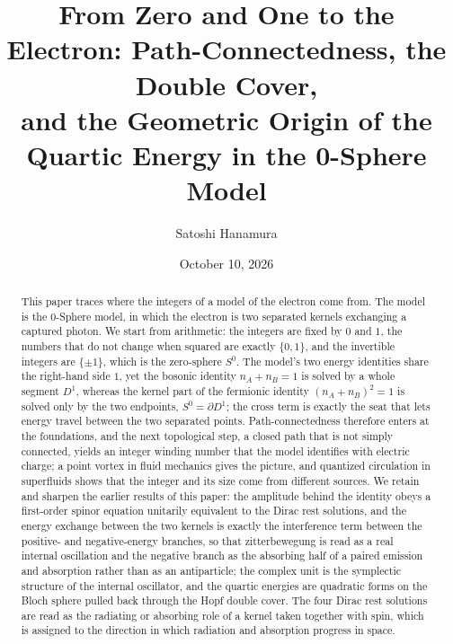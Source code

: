 \documentclass[%
 reprint, amsmath,amssymb, aps, prb, ]{revtex4-2}
\numberwithin{equation}{section}
\begin{document}
\title{From Zero and One to the Electron: Path-Connectedness, the Double Cover,\\ and the Geometric Origin of the Quartic Energy in the 0-Sphere Model}

\author{Satoshi Hanamura}

\date{October 10, 2026}

\begin{abstract}
This paper traces where the integers of a model of the electron come from. The model is the 0-Sphere model, in which the electron is two separated kernels exchanging a captured photon.
We start from arithmetic: the integers are fixed by $0$ and $1$, the numbers that do not change when squared are exactly $\{0,1\}$, and the invertible integers are $\{\pm1\}$, which is the zero-sphere $S^0$.
The model's two energy identities share the right-hand side $1$, yet the bosonic identity $n_A+n_B=1$ is solved by a whole segment $D^1$, whereas the kernel part of the fermionic identity $(n_A+n_B)^2=1$ is solved only by the two endpoints, $S^0=\partial D^1$; the cross term is exactly the seat that lets energy travel between the two separated points.
Path-connectedness therefore enters at the foundations, and the next topological step, a closed path that is not simply connected, yields an integer winding number that the model identifies with electric charge; a point vortex in fluid mechanics gives the picture, and quantized circulation in superfluids shows that the integer and its size come from different sources.
We retain and sharpen the earlier results of this paper: the amplitude behind the identity obeys a first-order spinor equation unitarily equivalent to the Dirac rest solutions, and the energy exchange between the two kernels is exactly the interference term between the positive- and negative-energy branches, so that zitterbewegung is read as a real internal oscillation and the negative branch as the absorbing half of a paired emission and absorption rather than as an antiparticle; the complex unit is the symplectic structure of the internal oscillator, and the quartic energies are quadratic forms on the Bloch sphere pulled back through the Hopf double cover. The four Dirac rest solutions are read as the radiating or absorbing role of a kernel taken together with spin, which is assigned to the direction in which radiation and absorption progress in space.

\end{abstract}
\end{document}
